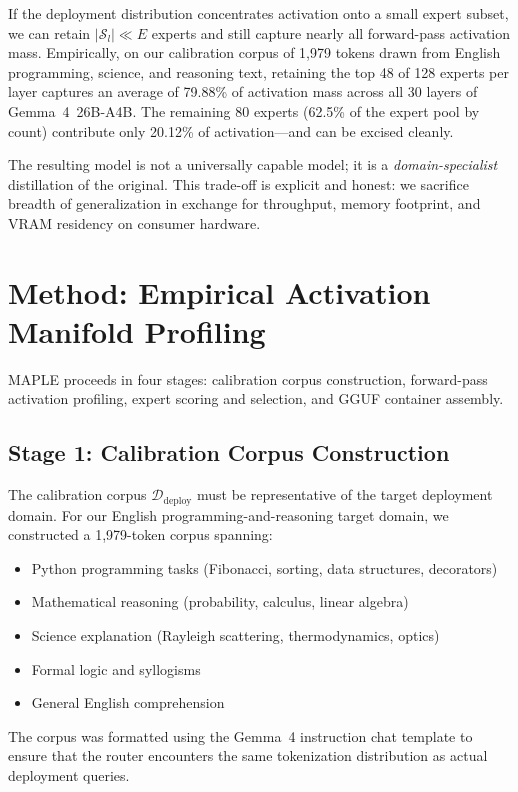 \documentclass[10pt]{article}
\newcommand{\MAPLE}{\textsc{MAPLE}}
\begin{document}
If the deployment distribution concentrates activation onto a small expert subset, we can retain $|\mathcal{S}_l| \ll E$ experts and still capture nearly all forward-pass activation mass. Empirically, on our calibration corpus of 1,979 tokens drawn from English programming, science, and reasoning text, retaining the top 48 of 128 experts per layer captures an average of 79.88\% of activation mass across all 30 layers of Gemma~4~26B-A4B. The remaining 80 experts (62.5\% of the expert pool by count) contribute only 20.12\% of activation---and can be excised cleanly.

The resulting model is not a universally capable model; it is a \emph{domain-specialist} distillation of the original. This trade-off is explicit and honest: we sacrifice breadth of generalization in exchange for throughput, memory footprint, and VRAM residency on consumer hardware.

\section{Method: Empirical Activation Manifold Profiling}
\label{sec:method}

\MAPLE{} proceeds in four stages: calibration corpus construction, forward-pass activation profiling, expert scoring and selection, and GGUF container assembly.

\subsection{Stage 1: Calibration Corpus Construction}
The calibration corpus $\mathcal{D}_\text{deploy}$ must be representative of the target deployment domain. For our English programming-and-reasoning target domain, we constructed a 1,979-token corpus spanning:
\begin{itemize}[leftmargin=1.5em,topsep=2pt,itemsep=1pt]
  \item Python programming tasks (Fibonacci, sorting, data structures, decorators)
  \item Mathematical reasoning (probability, calculus, linear algebra)
  \item Science explanation (Rayleigh scattering, thermodynamics, optics)
  \item Formal logic and syllogisms
  \item General English comprehension
\end{itemize}
The corpus was formatted using the Gemma~4 instruction chat template to ensure that the router encounters the same tokenization distribution as actual deployment queries.
\end{document}
